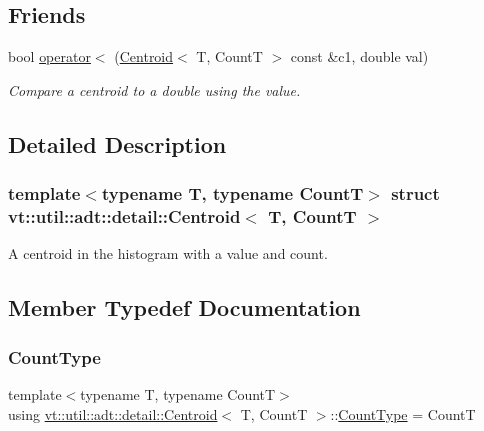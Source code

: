 \subsection*{Friends}
\begin{DoxyCompactItemize}
\item 
bool \hyperlink{structvt_1_1util_1_1adt_1_1detail_1_1_centroid_a6d689befe39b63c2d22558863e56084f}{operator$<$} (\hyperlink{structvt_1_1util_1_1adt_1_1detail_1_1_centroid}{Centroid}$<$ T, CountT $>$ const \&c1, double val)
\begin{DoxyCompactList}\small\item\em Compare a centroid to a double using the value. \end{DoxyCompactList}\end{DoxyCompactItemize}


\subsection{Detailed Description}
\subsubsection*{template$<$typename T, typename CountT$>$\newline
struct vt\+::util\+::adt\+::detail\+::\+Centroid$<$ T, Count\+T $>$}

A centroid in the histogram with a value and count. 



\subsection{Member Typedef Documentation}
\mbox{\label{structvt_1_1util_1_1adt_1_1detail_1_1_centroid_ac3815361e4f13eeb8b2863d2eb8db1dd}} 
\subsubsection{\texorpdfstring{Count\+Type}{CountType}}
{\footnotesize\ttfamily template$<$typename T, typename CountT$>$ \\
using \hyperlink{structvt_1_1util_1_1adt_1_1detail_1_1_centroid}{vt\+::util\+::adt\+::detail\+::\+Centroid}$<$ T, CountT $>$\+::\hyperlink{structvt_1_1util_1_1adt_1_1detail_1_1_centroid_ac3815361e4f13eeb8b2863d2eb8db1dd}{Count\+Type} =  CountT}



